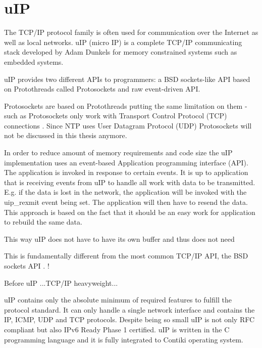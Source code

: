 
\section{uIP}\label{sec:contiki-uip}
The TCP/IP protocol family is often used for communication over the Internet as well as local networks.
uIP (micro IP) is a complete TCP/IP communicating stack developed by Adam Dunkels for memory constrained systems such as embedded systems.


uIP provides two different APIs to programmers: a BSD sockets-like API based on Protothreads called Protosockets
and raw event-driven API.

Protosockets are based on Protothreads putting the same limitation on them - such as 
\!
Protosockets only work with Transport Control Protocol (TCP) connections \cite{contiki-docs}.
Since NTP uses User Datagram Protocol (UDP) Protosockets will not be
discussed in this thesis anymore.

In order to reduce amount of memory requirements and code size the
uIP implementation uses an event-based Application programming interface (API).
The application is invoked in response to certain events.
It is up to application that is receiving events from uIP to handle all
work with data to be transmitted. E.g. if the data is lost in the network,
the application will be invoked with the uip\_rexmit event being set.
The application will then have to resend the data.
This approach is based on the fact that it should be an easy work for application
to rebuild the same data.

\!This way uIP does not have to have its own buffer and thus
does not need


This is fundamentally different from the most common TCP/IP API, the BSD sockets API \cite{thesis-programming}.
\!!


Before uIP ...TCP/IP heavyweight...

uIP contains only the absolute minimum of required features to fulfill the protocol standard.
It can only handle a single network interface and contains the IP, ICMP, UDP and TCP protocols.
Despite being so small uIP is not only RFC compliant but also IPv6 Ready Phase 1 certified.
uIP is written in the C programming language and it is fully integrated to Contiki operating system.
